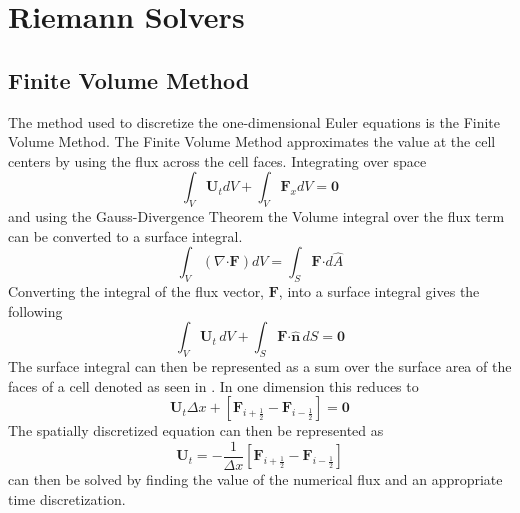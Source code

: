 \chapter{Riemann Solvers}\label{ch:NumericalMethods}
\section{Finite Volume Method}

The method used to discretize the one-dimensional Euler equations is the Finite Volume Method. The Finite Volume Method approximates the value at the cell centers by using the flux across the cell faces. Integrating  over space
\begin{equation}
	\int_V \boldsymbol{U}_t dV + \int_V \boldsymbol{F}_xdV = \boldsymbol{0}
\end{equation}
and using the Gauss-Divergence Theorem the Volume integral over the flux term can be converted to a surface integral.
\begin{equation}
	\int_V \left(\nabla \boldsymbol{\cdot} \boldsymbol{F}\right) dV = \int_S \boldsymbol{F} \boldsymbol{\cdot} d\hat{A}
\end{equation}
Converting the integral of the flux vector, $\boldsymbol{F}$, into a surface integral gives the following
\begin{equation}
	\int_V \boldsymbol{U}_t\,dV + \int_S  \boldsymbol{F} \boldsymbol{\cdot} \boldsymbol{\hat{n}}\,dS = \boldsymbol{0}
\end{equation}
The surface integral can then be represented as a sum over the surface area of the faces of a cell denoted as seen in . In one dimension this reduces to
\begin{equation}\label{eqn:spatiallydiscretized}
	\boldsymbol{U}_t \Delta x + \left[\boldsymbol{F}_{i+\frac{1}{2}} - \boldsymbol{F}_{i-\frac{1}{2}}\right] = \boldsymbol{0}
\end{equation}
The spatially discretized equation can then be represented as
\begin{equation}\label{eqn:spatiallydiscretized2}
	\boldsymbol{U}_t = - \frac{1}{\Delta x} \left[\boldsymbol{F}_{i+\frac{1}{2}} - \boldsymbol{F}_{i-\frac{1}{2}}\right]
\end{equation}
 can then be solved by finding the value of the numerical flux and an appropriate time discretization.
